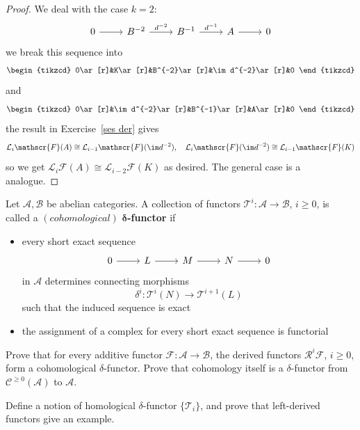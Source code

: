\begin{proof}
We deal with the case $k=2$:
\[\begin{tikzcd}
0\ar[r]&B^{-2}\ar[r,"d^{-2}"]&B^{-1}\ar[r,"d^{-1}"]&A\ar[r]&0
\end{tikzcd}\]
we break this sequence into
\[\begin{tikzcd}
0\ar[r]&K\ar[r]&B^{-2}\ar[r]&\im d^{-2}\ar[r]&0
\end{tikzcd}\]
and
\[\begin{tikzcd}
0\ar[r]&\im d^{-2}\ar[r]&B^{-1}\ar[r]&A\ar[r]&0
\end{tikzcd}\]
the result in Exercise~\ref{ses der} gives
\[\mathcal{L}_i\mathscr{F}(A)\cong\mathcal{L}_{i-1}\mathscr{F}(\im d^{-2}),\quad \mathcal{L}_i\mathscr{F}(\im d^{-2})\cong\mathcal{L}_{i-1}\mathscr{F}(K)\]
so we get $\mathcal{L}_i\mathscr{F}(A)\cong\mathcal{L}_{i-2}\mathscr{F}(K)$ as desired. The general case is a analogue.
\end{proof}
\begin{exercise}
Let $\mathcal{A},\mathcal{B}$ be abelian categories. A collection of functors $\mathscr{T}^i:\mathcal{A}\to\mathcal{B}$, $i\geq0$, is called a $(cohomological)$ \textbf{$\bm{\delta}$-functor} if
\begin{itemize}
\item every short exact sequence
\[\begin{tikzcd}
0\ar[r]&L\ar[r]&M\ar[r]&N\ar[r]&0
\end{tikzcd}\]
in $\mathcal{A}$ determines connecting morphisms
\[\delta^i:\mathscr{T}^i(N)\to\mathscr{T}^{i+1}(L)\]
such that the induced sequence is exact
\item the assignment of a complex for every short exact sequence is functorial
\end{itemize}
Prove that for every additive functor $\mathscr{F}:\mathcal{A}\to\mathcal{B}$, the derived functors $\mathcal{R}^i\mathscr{F}$, $i\geq0$, form a cohomological $\delta$-functor. Prove that cohomology itself is a $\delta$-functor from $\mathcal{C}^{\geq0}(\mathcal{A})$ to $\mathcal{A}$.\par
Define a notion of homological $\delta$-functor $\{\mathscr{T}_i\}$, and prove that left-derived functors give an example.
\end{exercise}
